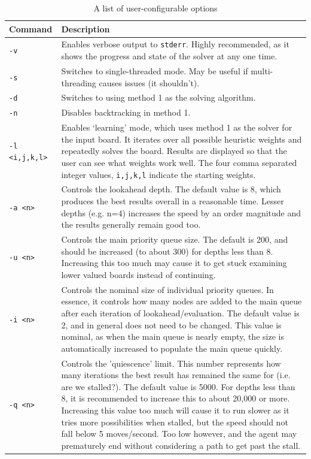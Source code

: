 \documentclass[a4paper, 11pt, titlepage]{report}
\begin{document}
\begin{appendices}
\begin{table}[H]
  \centering
  \caption{A list of user-configurable options}
    \begin{tabularx}{\textwidth}{lX}
    \hline
    Command & Description \\
    \hline
    \texttt{-v} & Enables verbose output to \texttt{stderr}. Highly recommended, as it shows the progress and state of the solver at any one time. \\
    \texttt{-s} & Switches to single-threaded mode. May be useful if multi-threading causes issues (it shouldn't). \\
    \texttt{-d} & Switches to using method 1 as the solving algorithm. \\
    \texttt{-n} & Disables backtracking in method 1. \\
    \texttt{-l <i,j,k,l>} & Enables `learning' mode, which uses method 1 as the solver for the input board. It iterates over all possible heuristic weights and repeatedly solves the board. Results are displayed so that the user can see what weights work well. The four comma separated integer values, \texttt{i,j,k,l} indicate the starting weights. \\
    \texttt{-a <n>} & Controls the lookahead depth. The default value is 8, which produces the best results overall in a reasonable time. Lesser depths (e.g. n=4) increases the speed by an order magnitude and the results generally remain good too.  \\
    \texttt{-u <n>} & Controls the main priority queue size. The default is 200, and should be increased (to about 300) for depths less than 8. Increasing this too much may cause it to get stuck examining lower valued boards instead of continuing. \\
    \texttt{-i <n>} & Controls the nominal size of individual priority queues. In essence, it controls how many nodes are added to the main queue after each iteration of lookahead/evaluation. The default value is 2, and in general does not need to be changed. This value is nominal, as when the main queue is nearly empty, the size is automatically increased to populate the main queue quickly. \\
    \texttt{-q <n>} & Controls the 'quiescence' limit. This number represents how many iterations the best result has remained the same for (i.e. are we stalled?). The default value is 5000. For depths less than 8, it is recommended to increase this to about 20,000 or more. Increasing this value too much will cause it to run slower as it tries more possibilities when stalled, but the speed should not fall below 5 moves/second. Too low however, and the agent may prematurely end without considering a path to get past the stall.\\

\end{tabularx}
\end{table}
\end{appendices}
\end{document}
